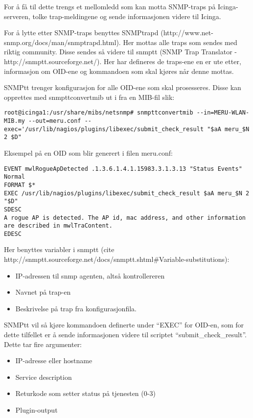 For å få til dette trengs et mellomledd som kan motta SNMP-traps på Icinga-serveren, tolke trap-meldingene og sende informasjonen videre til Icinga. 

For å lytte etter SNMP-traps benyttes SNMPtrapd (http://www.net-snmp.org/docs/man/snmptrapd.html). Her mottas alle traps som sendes med riktig community. Disse sendes så videre til snmptt (SNMP Trap Translator - http://snmptt.sourceforge.net/). Her har defineres de traps-ene en er ute etter, informasjon om OID-ene og kommandoen som skal kjøres når denne mottas.

SNMPtt trenger konfigurasjon for alle OID-ene som skal prosesseres. Disse kan opprettes med snmpttconvertmib ut i fra en MIB-fil slik:

\begin{lstlisting}
root@icinga1:/usr/share/mibs/netsnmp# snmpttconvertmib --in=MERU-WLAN-MIB.my --out=meru.conf --exec='/usr/lib/nagios/plugins/libexec/submit_check_result "$aA meru_$N 2 $D"
\end{lstlisting}

Eksempel på en OID som blir generert i filen meru.conf:

\begin{lstlisting}
EVENT mwlRogueApDetected .1.3.6.1.4.1.15983.3.1.3.13 "Status Events" Normal
FORMAT $*
EXEC /usr/lib/nagios/plugins/libexec/submit_check_result $aA meru_$N 2 "$D"
SDESC
A rogue AP is detected. The AP id, mac address, and other information are described in mwlTraContent.
EDESC
\end{lstlisting}

Her benyttes variabler i snmptt (cite http://snmptt.sourceforge.net/docs/snmptt.shtml#Variable-substitutions):
\begin{itemize}
	\item IP-adressen til snmp agenten, altså kontrollereren
	\item Navnet på trap-en
	\item Beskrivelse på trap fra konfigurasjonfila.
\end{itemize}

SNMPtt vil så kjøre kommandoen definerte under “EXEC” for OID-en, som for dette tilfellet er å sende informasjonen videre til scriptet “submit\_check\_result”. Dette tar fire argumenter:

\begin{itemize}
	\item IP-adresse eller hostname 
	\item Service description
	\item Returkode som setter status på tjenesten (0-3)
	\item Plugin-output
\end{itemize}

